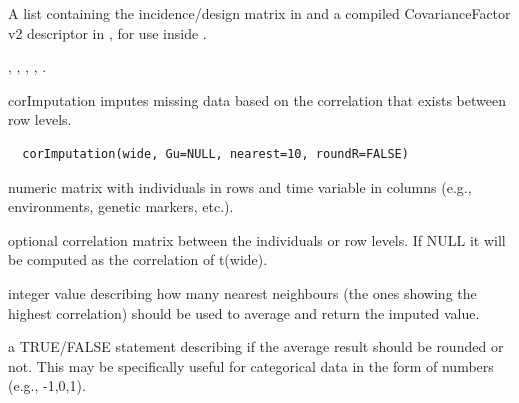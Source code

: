 \documentclass[a4paper]{book}
\begin{document}
%
\begin{Value}
A list containing the incidence/design matrix in  and a compiled CovarianceFactor v2 descriptor in , for use inside .
\end{Value}
%
\begin{SeeAlso}\relax
{}, , ,
, .
\end{SeeAlso}
%
\begin{Examples}
\end{Examples}
%
\begin{Description}\relax
corImputation imputes missing data based on the correlation that exists between row levels.
\end{Description}
%
\begin{Usage}
\begin{verbatim}
  corImputation(wide, Gu=NULL, nearest=10, roundR=FALSE)
\end{verbatim}
\end{Usage}
%
\begin{Arguments}
\begin{ldescription}
\item[\code{wide}] numeric matrix with individuals in rows and time variable in columns (e.g., environments, genetic markers, etc.).
\item[\code{Gu}] optional correlation matrix between the individuals or row levels. If NULL it will be computed as the correlation of t(wide).
\item[\code{nearest}] integer value describing how many nearest neighbours (the ones showing the highest correlation) should be used to average and return the imputed value.
\item[\code{roundR}] a TRUE/FALSE statement describing if the average result should be rounded or not. This may be specifically useful for categorical data in the form of numbers (e.g., -1,0,1).
\end{ldescription}
\end{Arguments}
\end{document}
